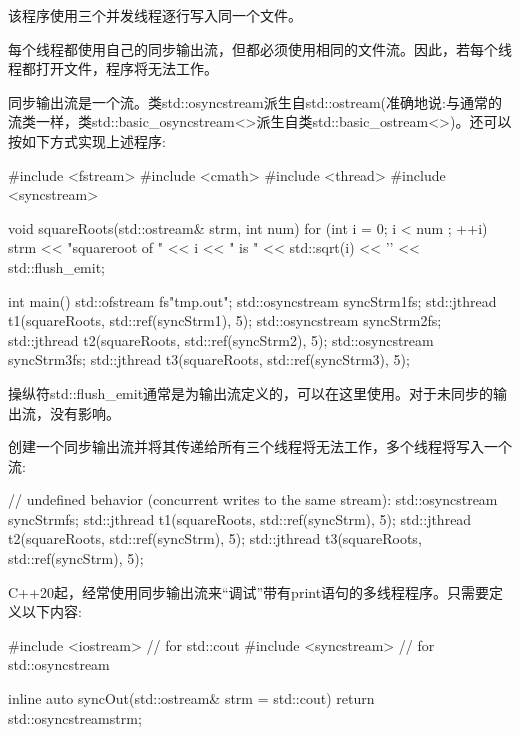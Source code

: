 该程序使用三个并发线程逐行写入同一个文件。

每个线程都使用自己的同步输出流，但都必须使用相同的文件流。因此，若每个线程都打开文件，程序将无法工作。


同步输出流是一个流。类std::osyncstream派生自std::ostream(准确地说:与通常的流类一样，类std::basic\_osyncstream<>派生自类std::basic\_ostream<>)。还可以按如下方式实现上述程序:


\begin{cpp}
#include <fstream>
#include <cmath>
#include <thread>
#include <syncstream>

void squareRoots(std::ostream& strm, int num)
{
	for (int i = 0; i < num ; ++i) {
		strm << "squareroot of " << i << " is "
			 << std::sqrt(i) << '\n' << std::flush_emit;
	}
}

int main()
{
	std::ofstream fs{"tmp.out"};
	std::osyncstream syncStrm1{fs};
	std::jthread t1(squareRoots, std::ref(syncStrm1), 5);
	std::osyncstream syncStrm2{fs};
	std::jthread t2(squareRoots, std::ref(syncStrm2), 5);
	std::osyncstream syncStrm3{fs};
	std::jthread t3(squareRoots, std::ref(syncStrm3), 5);
}
\end{cpp}

操纵符std::flush\_emit通常是为输出流定义的，可以在这里使用。对于未同步的输出流，没有影响。

创建一个同步输出流并将其传递给所有三个线程将无法工作，多个线程将写入一个流:

\begin{cpp}
// undefined behavior (concurrent writes to the same stream):
std::osyncstream syncStrm{fs};
std::jthread t1(squareRoots, std::ref(syncStrm), 5);
std::jthread t2(squareRoots, std::ref(syncStrm), 5);
std::jthread t3(squareRoots, std::ref(syncStrm), 5);
\end{cpp}


C++20起，经常使用同步输出流来“调试”带有print语句的多线程程序。只需要定义以下内容:

\begin{cpp}
#include <iostream> // for std::cout
#include <syncstream> // for std::osyncstream

inline auto syncOut(std::ostream& strm = std::cout) {
	return std::osyncstream{strm};
}
\end{cpp}

